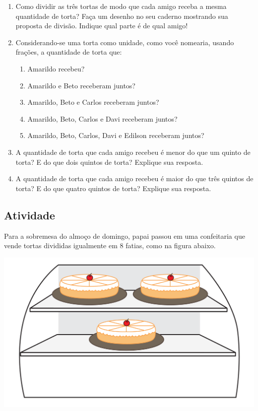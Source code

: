 \begin{enumerate} [\quad a)] %
  \item     Como dividir as três tortas de modo que cada amigo receba a mesma quantidade de torta? Faça um desenho no seu caderno mostrando sua proposta de divisão. Indique qual parte é de qual amigo!
  \item     Considerando-se uma torta como unidade, como você nomearia, usando frações, a quantidade de torta que:     
\begin{enumerate} [\quad I)] %
      \item         Amarildo recebeu? 
      \item         Amarildo e Beto receberam juntos? 
      \item         Amarildo, Beto e Carlos receberam juntos? 
      \item         Amarildo, Beto, Carlos e Davi receberam juntos?
      \item         Amarildo, Beto, Carlos, Davi e Edilson receberam juntos?
\end{enumerate} %

  \item     A quantidade de torta que cada amigo recebeu é menor do que um quinto de torta? E do que dois quintos de torta? Explique sua resposta.
  \item     A quantidade de torta que cada amigo recebeu é maior do que três quintos de torta? E do que quatro quintos de torta? Explique sua resposta.
\end{enumerate} %


\subsection{Atividade}

Para a sobremesa do almoço de domingo, papai passou em uma confeitaria que vende tortas divididas igualmente em 8 fatias, como na figura abaixo. 
\begin{center}
\includegraphics[width=.6\textwidth, keepaspectratio]{..//media/cap2/secoes/pngs_licao_02/ativ3_fig01.png} 
\end{center}

